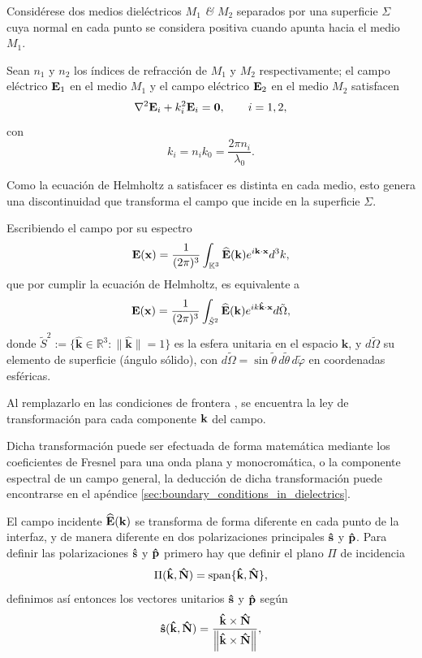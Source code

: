 Considérese dos medios dieléctricos $M_1$ \textit{\&} $M_2$ separados por una superficie $\Sigma$ cuya normal en cada punto se considera positiva cuando apunta hacia el medio $M_1$.

Sean $n_1$ y $n_2$ los índices de refracción de $M_1$ y $M_2$ respectivamente; el campo eléctrico $\vb E_1$ en el medio $M_1$ y el campo eléctrico $\vb E_2$ en el medio $M_2$ satisfacen
\begin{equation}
  \nabla^2 \vb E_i + k_i^2 \vb E_i = \vb 0,
  \qquad
  i=1,2,
\end{equation}
con
\[
  k_i = n_i k_0 = \frac{2\pi n_i}{\lambda_0}.
\]

Como la ecuación de Helmholtz a satisfacer es distinta en cada medio, esto genera una discontinuidad que transforma el campo que incide en la superficie $\Sigma$.


Escribiendo el campo por su espectro
\begin{equation*} 
  \vb{E}(\vb x) = \frac{1}{(2\pi)^3} \int_{\mathbb K^3} \widehat{\vb{E}} (\vb{k}) e^{i\vb k \cdot \vb x} d^3k,
\end{equation*}
que por cumplir la ecuación de Helmholtz, es equivalente a
\begin{equation*} 
  \vb{E}(\vb x) = \frac{1}{(2\pi)^3} \int_{\tilde{S}^2} \widehat{\vb{E}} (\vb{k}) e^{ik \bm{\hat{\mathbf{k}}} \cdot \vb x} d\tilde{\Omega},
\end{equation*}
donde $\tilde S^2:=\{\hat{\mathbf k}\in\mathbb R^3:\|\hat{\mathbf k}\|=1\}$ es la esfera unitaria en el espacio $\mathbf{k}$, y $d\tilde\Omega$ su elemento de superficie (ángulo sólido), con $d\tilde\Omega=\sin\tilde\theta\,d\tilde\theta\,d\tilde\varphi$ en coordenadas esféricas.

Al remplazarlo en las condiciones de frontera \cite{jackson1999}, se encuentra la ley de transformación para cada componente $\vb k$ del campo.

Dicha transformación puede ser efectuada de forma matemática mediante los coeficientes de Fresnel para una onda plana y monocromática, o la componente espectral de un campo general, la deducción de dicha transformación puede encontrarse en el apéndice \ref{sec:boundary_conditions_in_dielectrics}.


El campo incidente $\widehat{\vb E}(\vb k)$ se transforma de forma diferente en cada punto de la interfaz, y de manera diferente en dos polarizaciones principales $\bm{\hat{\mathbf{s}}}$ y $\bm{\hat{\mathbf{p}}}$.
Para definir las polarizaciones $\bm{\hat{\mathbf{s}}}$ y $\bm{\hat{\mathbf{p}}}$ primero hay que definir el plano $\Pi$ de incidencia
\begin{equation}
\Pi(\bm{\hat{\mathbf{k}}},\bm{\hat{\mathbf{N}}}) = \operatorname{span}\{\bm{\hat{\mathbf{k}}}, \bm{\hat{\mathbf{N}}}\},
\label{eq:pi}
\end{equation}
definimos así entonces los vectores unitarios $\bm{\hat{\mathbf{s}}}$ y $\bm{\hat{\mathbf{p}}}$ según
\begin{equation}
  \bm{\hat{\mathbf{s}}}(\bm{\hat{\mathbf{k}}},\bm{\hat{\mathbf{N}}})
  = \frac{\bm{\hat{\mathbf{k}}}\times\bm{\hat{\mathbf{N}}}}
  {\left\|\bm{\hat{\mathbf{k}}}\times\bm{\hat{\mathbf{N}}}\right\|},
\label{eq:sdef}
\end{equation}

